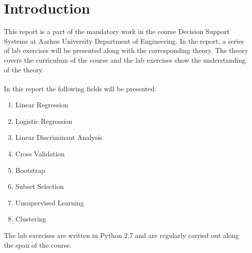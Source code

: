 \chapter{Introduction}
\label{chp:intro}

This report is a part of the mandatory work in the course Decision Support Systems at Aarhus University Department of Engineering.
In the report, a series of lab exercises will be presented along with the corresponding theory. 
The theory covers the curriculum of the course and the lab exercises show the understanding of the theory. 
\\
\\
In this report the following fields will be presented:
\begin{enumerate}  
	\item Linear Regression
	\item Logistic Regression
	\item Linear Discriminant Analysis
	\item Cross Validation
	\item Bootstrap
	\item Subset Selection
	\item Unsupervised Learning
	\item Clustering 
\end{enumerate} 
The lab exercises are written in Python 2.7 and are regularly carried out along the span of the course. 